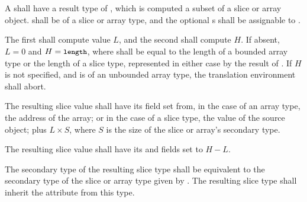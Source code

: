 
\begin{grammar}
 \\
	 \terminal{[}    \terminal{]} \\
\end{grammar}

\specsubsubitem
A  shall have a result type of
, which is computed a subset of a slice or array object.
 shall be of a slice or array type, and the
optional s shall be assignable to
.

\specsubsubitem
The first  shall compute value $L$, and the
second shall compute $H$. If absent, $L = 0$ and $H = \mbox{\textup{\small\texttt{length}}}$, where
 shall be equal to the length of a bounded array type or the
length of a slice type, represented in either case by the result of
. If $H$ is not specified, and
 is of an unbounded array type, the translation
environment shall abort.

\specsubsubitem
The resulting slice value shall have its  field set from, in the case
of an array type, the address of the array; or in the case of a slice type, the
 value of the source object; plus $L \times S$, where $S$ is the
size of the slice or array's secondary type.

\specsubsubitem
The resulting slice value shall have its  and 
fields set to $H - L$.

\specsubsubitem
The secondary type of the resulting slice type shall be equivalent to the
secondary type of the slice or array type given by
. The resulting slice type shall inherit the
 attribute from this type.


\begin{grammar}
 \\
	 \\
	 \\
	 \\
	 \\
	 \\
	 \\
	 \\
\end{grammar}

